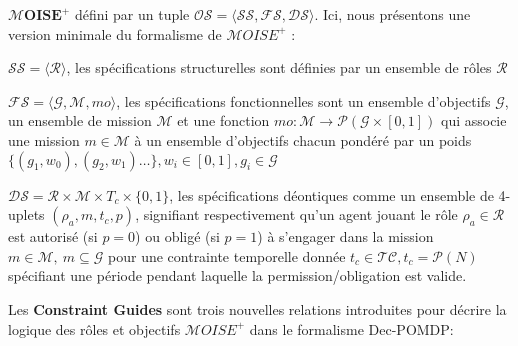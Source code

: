 \documentclass[sigconf,anonymous]{aamas}
\begin{document}
$\mathbf{\mathcal{M}OISE^+}$ \quad défini par un tuple $\mathcal{OS} = \langle \mathcal{SS}, \mathcal{FS}, \mathcal{DS} \rangle$. Ici, nous présentons une version minimale du formalisme de $\mathcal{M}OISE^+$ :
\begin{itemize*}[label={},itemjoin={; }]
    \item $\mathcal{SS} = \langle \mathcal{R} \rangle$, les spécifications structurelles sont définies par un ensemble de rôles $\mathcal{R}$
    \item $\mathcal{FS} = \langle \mathcal{G}, \mathcal{M}, mo \rangle$, les spécifications fonctionnelles sont un ensemble d'objectifs $\mathcal{G}$, un ensemble de mission $\mathcal{M}$ et une fonction $mo: \mathcal{M} \to \mathcal{P}(\mathcal{G} \times [0,1])$ qui associe une mission $m \in \mathcal{M}$ à un ensemble d'objectifs chacun pondéré par un poids $\{(g_1,w_0), (g_2,w_1)\dots\}, w_i \in [0,1], g_i \in \mathcal{G}$
    \item $\mathcal{DS} = \mathcal{R} \times \mathcal{M} \times T_c \times \{0,1\}$, les spécifications déontiques comme un ensemble de 4-uplets $(\rho_a, m, \allowbreak t_c, p)$, signifiant respectivement qu'un agent jouant le rôle $\rho_a \in \mathcal{R}$ est autorisé (si $p = 0$) ou obligé (si $p = 1$) à s'engager dans la mission $m \in \mathcal{M}, \ m \subseteq \mathcal{G}$ pour une contrainte temporelle donnée $t_c \in \mathcal{TC}, t_c = \mathcal{P}(N)$ spécifiant une période pendant laquelle la permission/obligation est valide.
\end{itemize*}

Les \textbf{Constraint Guides} \quad sont trois nouvelles relations introduites pour décrire la logique des rôles et objectifs $\mathcal{M}OISE^+$ dans le formalisme Dec-POMDP:
\end{document}
